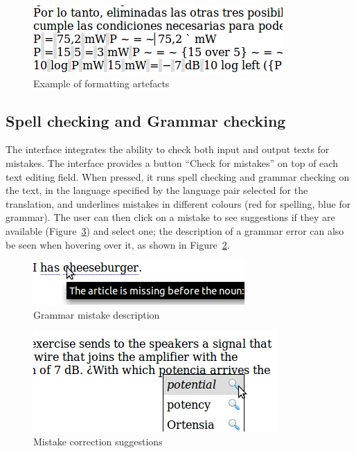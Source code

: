 \documentclass[11pt]{article}
\begin{document}
\begin{figure}[!h]
  \caption{\label{CaptureCloseupFormatting} Example of formatting 
  artefacts}
     \includegraphics[width=\columnwidth]{CaptureCloseupFormatting.png}
\end{figure}

\subsection{Spell checking and Grammar checking}

The interface integrates the ability to check both input and output texts 
for mistakes. 
The interface provides a button ``Check for mistakes'' on top of each text 
editing field. 
When pressed, it runs spell checking and grammar checking on the text, 
in the language specified by the language pair selected for the 
translation, and underlines mistakes in different colours (red for 
spelling, blue for grammar). 
The user can then click on a mistake to see suggestions if they are 
available (Figure~\ref{CaptureCloseupSuggestions}) and select one; the 
description of a grammar error can also be seen when hovering over it, as 
shown in Figure~\ref{CaptureCloseupGrammarMistake}.

\begin{figure}[!h]
  \caption{\label{CaptureCloseupGrammarMistake} Grammar mistake 
  description}
     \includegraphics[width=\columnwidth]{CaptureCloseupGrammarMistake.png}
\end{figure}

\begin{figure}[!h]
  \caption{\label{CaptureCloseupSuggestions} Mistake correction 
  suggestions}
     \includegraphics[width=\columnwidth]{CaptureCloseupSuggestions.png}
\end{figure}
\end{document}
